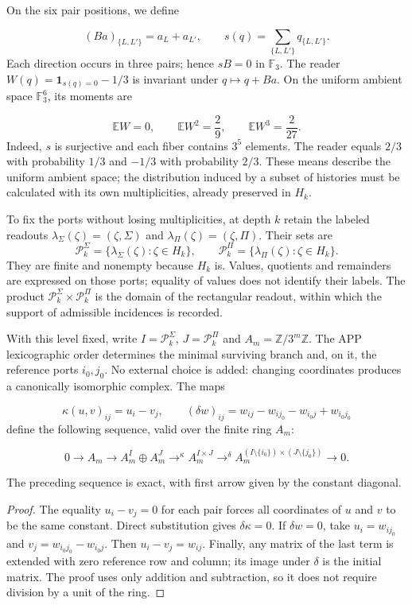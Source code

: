 On the six pair positions, we define

\[
(Ba)_{\{L,L'\}}=a_L+a_{L'},
\qquad
s(q)=\sum_{\{L,L'\}}q_{\{L,L'\}}.
\]
Each direction occurs in three pairs; hence \(sB=0\) in \(\mathbb F_3\). The reader \(W(q)=\mathbf1_{s(q)=0}-1/3\) is invariant under \(q\mapsto q+Ba\). On the uniform ambient space \(\mathbb F_3^6\), its moments are

\[
\mathbb EW=0,\qquad
\mathbb EW^2=\frac29,\qquad
\mathbb EW^3=\frac2{27}.
\]
Indeed, \(s\) is surjective and each fiber contains \(3^5\) elements. The reader equals \(2/3\) with probability \(1/3\) and \(-1/3\) with probability \(2/3\). These means describe the uniform ambient space; the distribution induced by a subset of histories must be calculated with its own multiplicities, already preserved in \(H_k\).

To fix the ports without losing multiplicities, at depth \(k\) retain the labeled readouts \(\lambda_\Sigma(\zeta)=(\zeta,\Sigma)\) and \(\lambda_\Pi(\zeta)=(\zeta,\Pi)\). Their sets are
\[
\mathscr P_k^\Sigma=\{\lambda_\Sigma(\zeta):\zeta\in H_k\},\qquad
\mathscr P_k^\Pi=\{\lambda_\Pi(\zeta):\zeta\in H_k\}.
\]
They are finite and nonempty because \(H_k\) is. Values, quotients and remainders are expressed on those ports; equality of values does not identify their labels. The product \(\mathscr P_k^\Sigma\times\mathscr P_k^\Pi\) is the domain of the rectangular readout, within which the support of admissible incidences is recorded.

With this level fixed, write \(I=\mathscr P_k^\Sigma\), \(J=\mathscr P_k^\Pi\) and \(A_m=\mathbb Z/3^m\mathbb Z\). The APP lexicographic order determines the minimal surviving branch and, on it, the reference ports \(i_0,j_0\). No external choice is added: changing coordinates produces a canonically isomorphic complex. The maps

\[
\kappa(u,v)_{ij}=u_i-v_j,
\qquad
(\delta w)_{ij}=w_{ij}-w_{ij_0}-w_{i_0j}+w_{i_0j_0}
\]
define the following sequence, valid over the finite ring \(A_m\):

\[
0\longrightarrow A_m\longrightarrow
A_m^I\oplus A_m^J\mathrel{\mathop{\longrightarrow}^{\kappa}}
A_m^{I\times J}\mathrel{\mathop{\longrightarrow}^{\delta}}
A_m^{(I\setminus\{i_0\})\times(J\setminus\{j_0\})}
\longrightarrow0.
\]
\begin{proposition}
\label{hmtfg:base:prop:continuo-exactitud-rectangular}
The preceding sequence is exact, with first arrow given by the constant diagonal.
\end{proposition}
\begin{proof}
The equality \(u_i-v_j=0\) for each pair forces all coordinates of \(u\) and \(v\) to be the same constant. Direct substitution gives \(\delta\kappa=0\). If \(\delta w=0\), take \(u_i=w_{ij_0}\) and \(v_j=w_{i_0j_0}-w_{i_0j}\). Then \(u_i-v_j=w_{ij}\). Finally, any matrix of the last term is extended with zero reference row and column; its image under \(\delta\) is the initial matrix. The proof uses only addition and subtraction, so it does not require division by a unit of the ring.
\end{proof}

